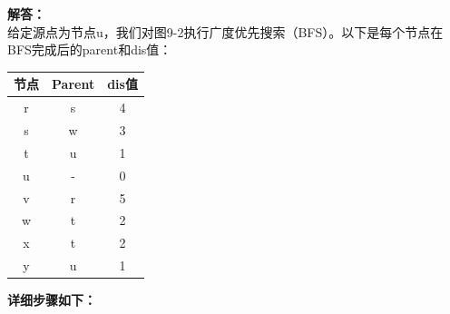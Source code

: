 \documentclass{article}
\begin{document}
\noindent\textbf{解答：}\\
给定源点为节点u，我们对图9-2执行广度优先搜索（BFS）。以下是每个节点在BFS完成后的parent和dis值：

\begin{center}
\begin{tabular}{|c|c|c|}
    \hline
    节点 & Parent & dis值 \\
    \hline
    r & s & 4 \\
    s & w & 3 \\
    t & u & 1 \\
    u & - & 0 \\
    v & r & 5 \\
    w & t & 2 \\
    x & t & 2 \\
    y & u & 1 \\
    \hline
\end{tabular}
\end{center}

\noindent\textbf{详细步骤如下：}
\end{document}
